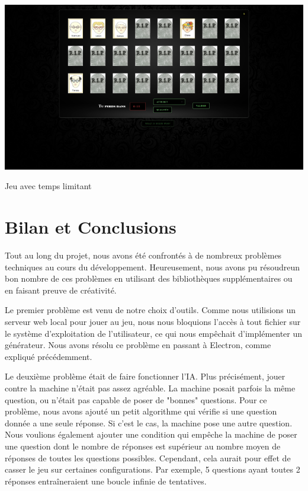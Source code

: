 \documentclass[a4paper, 12pt]{article}
\begin{document}
\begin{center}               %
  \includegraphics[scale=0.5]{Timer2.png}\newline%

\end{center}
\begin{center}  
  Jeu avec temps limitant
\end{center}
\newpage
\section{Bilan et Conclusions}

Tout au long du projet, nous avons été confrontés à de nombreux problèmes techniques au cours du développement. Heureusement, nous avons pu résoudreun  bon nombre de ces problèmes en utilisant des bibliothèques supplémentaires ou en faisant preuve de créativité.\newline

Le premier problème est venu de notre choix d'outils. Comme nous utilisions un serveur web local pour jouer au jeu, nous nous bloquions l'accès à tout fichier sur le système d'exploitation de l'utilisateur, ce qui nous empêchait d'implémenter un générateur. Nous avons résolu ce problème en passant à Electron, comme expliqué précédemment.\newline

Le deuxième problème était de faire fonctionner l'IA. Plus précisément, jouer contre la machine n'était pas assez agréable. La machine posait parfois la même question, ou n'était pas capable de poser de "bonnes" questions. Pour ce problème, nous avons ajouté un petit algorithme qui vérifie si une question donnée a une seule réponse. Si c'est le cas, la machine pose une autre question. Nous voulions également ajouter une condition qui empêche la machine de poser une question dont le nombre de réponses est supérieur au nombre moyen de réponses de toutes les questions possibles. Cependant, cela aurait pour effet de casser le jeu sur certaines configurations. Par exemple, 5 questions ayant toutes 2 réponses entraîneraient une boucle infinie de tentatives.\newline
\end{document}
